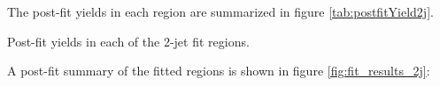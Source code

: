 
The post-fit yields in each region are summarized in figure \ref{tab:postfitYield2j}.

\begin{table}[H]
\begin{adjustwidth}{-3em}{-3em}

\label{tab:postfitYield2j}
\caption{Post-fit yields in each of the 2-jet fit regions.}                                                         
\end{adjustwidth}
\end{table}


A post-fit summary of the fitted regions is shown in figure \ref{fig:fit_results_2j}: 

